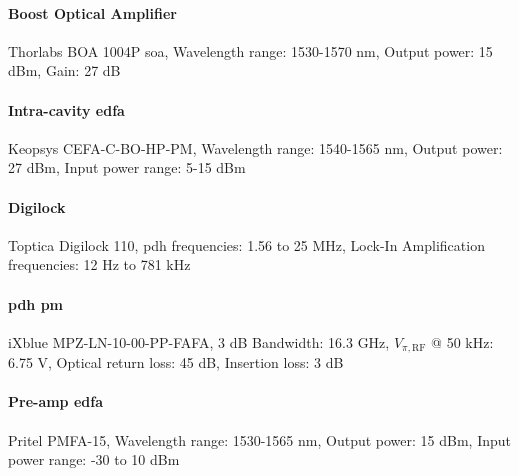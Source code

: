 \paragraph{Boost Optical Amplifier} Thorlabs BOA 1004P \gls{soa}, Wavelength range: 1530-1570 nm, Output power: 15 dBm, Gain: 27 dB \cite{boa}

\paragraph{Intra-cavity \acrlong{edfa}} Keopsys CEFA-C-BO-HP-PM, Wavelength range: 1540-1565 nm, Output power: 27 dBm, Input power range: 5-15 dBm \cite{edfa}

\paragraph{Digilock} Toptica Digilock 110, \gls{pdh} frequencies: 1.56 to 25 MHz, Lock-In Amplification frequencies: 12 Hz to 781 kHz \cite{digilock}

\paragraph{\gls{pdh} \acrlong{pm}} iXblue MPZ-LN-10-00-PP-FAFA, 3 dB Bandwidth: 16.3 GHz, $V_{\pi,\text{RF}}$ @ 50 kHz: 6.75 V, Optical return loss: 45 dB, Insertion loss: 3 dB \cite{pdh-pm}

\paragraph{Pre-amp \acrlong{edfa}} Pritel PMFA-15, Wavelength range: 1530-1565 nm, Output power: 15 dBm, Input power range: -30 to 10 dBm \cite{pritel}

